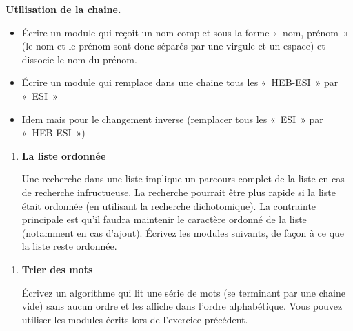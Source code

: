 \begin{enumerate}
			\textbf{Utilisation de la chaine.}

			\liststyleListv
			\begin{itemize}
				\item 
					Écrire un module qui reçoit un nom complet
					sous la forme «~nom, prénom~» (le nom et le prénom sont donc séparés
					par une virgule et un espace) et dissocie le nom du prénom. 
				\item 
					Écrire un module qui remplace dans une chaine
					tous les «~HEB-ESI~» par «~ESI~»
				\item 
					Idem mais pour le changement inverse 
					(remplacer tous les «~ESI~» par «~HEB-ESI~»)
			\end{itemize}

	\end{enumerate}
		\liststyleExercice
		
	\liststyleExercice
	\setcounter{saveenum}{\value{enumi}}
	\begin{enumerate}
	\setcounter{enumi}{\value{saveenum}}
		\item {\sffamily\bfseries
		La liste ordonnée}
		
			Une recherche dans une liste implique un parcours complet de la liste en
			cas de recherche infructueuse. La recherche pourrait être plus rapide
			si la liste était ordonnée (en utilisant la recherche dichotomique). La
			contrainte principale est qu'il faudra maintenir le
			caractère ordonné de la liste (notamment en cas
			d'ajout). Écrivez les modules suivants, de façon à ce
			que la liste reste ordonnée.


	\end{enumerate}
	
	\liststyleExercice
	\setcounter{saveenum}{\value{enumi}}
	\begin{enumerate}
	\setcounter{enumi}{\value{saveenum}}
	\item {\sffamily\bfseries
	Trier des mots}
		
			Écrivez un algorithme qui lit une série de mots (se terminant par une
			chaine vide) sans aucun ordre et les affiche dans l’ordre alphabétique.
			Vous pouvez utiliser les modules écrits lors de
			l'exercice précédent.
			
	\end{enumerate}

